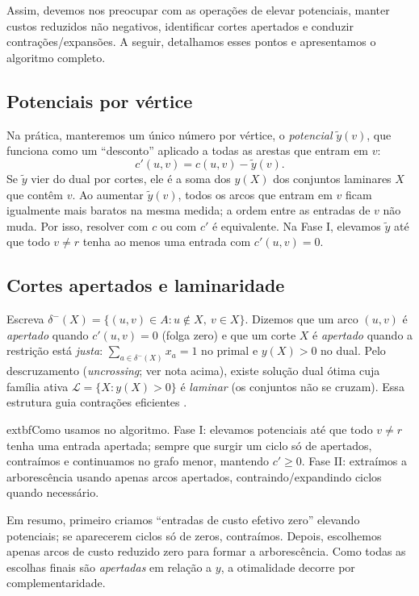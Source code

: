Assim, devemos nos preocupar com as operações de elevar potenciais, manter custos reduzidos não negativos, identificar cortes apertados e conduzir contrações/expansões. A seguir, detalhamos esses pontos e apresentamos o algoritmo completo.

\subsection{Potenciais por vértice}

Na prática, manteremos um único número por vértice, o \emph{potencial} \(\tilde y(v)\), que funciona como um “desconto” aplicado a todas as arestas que entram em \(v\):
\[
	c'(u,v) = c(u,v) - \tilde y(v).
\]
Se \(\tilde y\) vier do dual por cortes, ele é a soma dos \(y(X)\) dos conjuntos laminares \(X\) que contêm \(v\). Ao aumentar \(\tilde y(v)\), todos os arcos que entram em \(v\) ficam igualmente mais baratos na mesma medida; a ordem entre as entradas de \(v\) não muda. Por isso, resolver com \(c\) ou com \(c'\) é equivalente. Na Fase I, elevamos \(\tilde y\) até que todo \(v\neq r\) tenha ao menos uma entrada com \(c'(u,v)=0\).

\subsection{Cortes apertados e laminaridade}

Escreva \(\delta^-(X)=\{(u,v)\in A: u\notin X,\ v\in X\}\). Dizemos que um arco \((u,v)\) é \emph{apertado} quando \(c'(u,v)=0\) (folga zero) e que um corte \(X\) é \emph{apertado} quando a restrição está \emph{justa}: \(\sum_{a\in \delta^-(X)} x_a=1\) no primal e \(y(X)>0\) no dual. Pelo descruzamento (\emph{uncrossing}; ver nota acima), existe solução dual ótima cuja família ativa \(\mathcal{L}=\{X: y(X)>0\}\) é \emph{laminar} (os conjuntos não se cruzam). Essa estrutura guia contrações eficientes \cite{frank2014,schrijver2003comb}.

extbf{Como usamos no algoritmo.} Fase I: elevamos potenciais até que todo \(v\neq r\) tenha uma entrada apertada; sempre que surgir um ciclo só de apertados, contraímos e continuamos no grafo menor, mantendo \(c'\ge 0\). Fase II: extraímos a arborescência usando apenas arcos apertados, contraindo/expandindo ciclos quando necessário.


Em resumo, primeiro criamos “entradas de custo efetivo zero” elevando potenciais; se aparecerem ciclos só de zeros, contraímos. Depois, escolhemos apenas arcos de custo reduzido zero para formar a arborescência. Como todas as escolhas finais são \emph{apertadas} em relação a \(y\), a otimalidade decorre por complementaridade.



